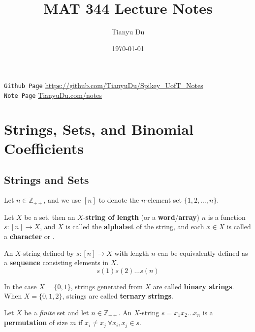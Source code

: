\documentclass{article}
\title{MAT 344 Lecture Notes}
\date{\today}
\author{Tianyu Du}
\def\Z{{\mathbb Z}}
\begin{document}
	\maketitle
	\doclicenseThis
	\texttt{Github Page} \url{https://github.com/TianyuDu/Spikey_UofT_Notes}\\
	\texttt{Note Page} \url{TianyuDu.com/notes}
	
	\tableofcontents
	\newpage
	
	\section{Strings, Sets, and Binomial Coefficients}
		\subsection{Strings and Sets}
			\begin{notation}
				Let $n \in \Z_{++}$, and we use $[n]$ to denote the $n$-element set $\{1,2,\dots,n\}$.
			\end{notation}
			
			\begin{definition}
				Let $X$ be a set, then an $X$-\textbf{string of length} (or a \textbf{word}/\textbf{array}) $n$ is a function $s:[n] \to X$, and $X$ is called the \textbf{alphabet} of the string, and each $x \in X$ is called a \textbf{character} or .
			\end{definition}
			
			\begin{remark}
				An $X$-string defined by $s: [n] \to X$ with length $n$ can be equivalently defined as a \textbf{sequence} consisting elements in $X$.
				\begin{equation}
					s(1)s(2)\dots s(n)
				\end{equation}
			\end{remark}
			
			\begin{definition}
				In the case $X = \{0, 1\}$, strings generated from $X$ are called \textbf{binary strings}. When $X = \{0,1,2\}$, strings are called \textbf{ternary strings}.
			\end{definition}
			
			\begin{definition}
				Let $X$ be a \emph{finite} set and let $n \in \Z_{++}$. An $X$-string $s = x_1 x_2 \dots x_n$ is a \textbf{permutation} of size $m$ if $x_i \neq x_j\ \forall x_i, x_j \in s$.
			\end{definition}
			
\end{document}
